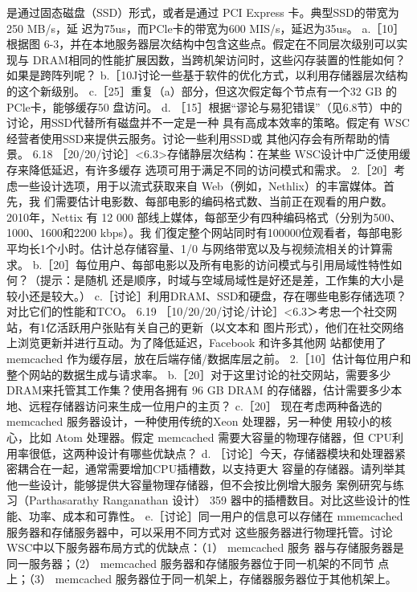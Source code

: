 是通过固态磁盘（SSD）形式，或者是通过 PCI Express 卡。典型SSD的带宽为250 MB/s，延
迟为75us，而PCle卡的带宽为600 MIS/s，延迟为35us。
a.［10］根据图 6-3，并在本地服务器层次结构中包含这些点。假定在不同层次级别可以实现与
DRAM相同的性能扩展因数，当跨机架访问时，这些闪存装置的性能如何？如果是跨阵列呢？
b.［10J讨论一些基于软件的优化方式，以利用存储器层次结构的这个新级别。
c.［25］重复（a）部分，但这次假定每个节点有一个32 GB 的PCle卡，能够缓存50%
盘访问。
d. ［15］根据“谬论与易犯错误”（见6.8节）中的讨论，用SSD代替所有磁盘并不一定是一种
具有高成本效率的策略。假定有 WSC经营者使用SSD来提供云服务。讨论一些利用SSD或
其他闪存会有所帮助的情景。
6.18
［20/20/讨论］<6.3>存储静层次结构：在某些 WSC设计中广泛使用缓存来降低延迟，有许多缓存
选项可用于满足不同的访问模式和需求。
2.［20］考虑一些设计选项，用于以流式获取来自 Web（例如，Nethlix）的丰富媒体。首先，我
们需要估计电影数、每部电影的编码格式数、当前正在观看的用户数。2010年，Nettix 有
12 000 部线上媒体，每部至少有四种编码格式（分别为500、1000、1600和2200 kbps）。我
们復定整个网站同时有100000位观看者，每部电影平均长1个小时。估计总存储容量、1/0
与网络带宽以及与视频流相关的计算需求。
b.［20］每位用户、每部电影以及所有电影的访问模式与引用局域性特性如何？（提示：是随机
还是顺序，时域与空域局域性是好还是差，工作集的大小是较小还是较大。）
c.［讨论］利用DRAM、SSD和硬盘，存在哪些电影存储选项？对比它们的性能和TCO。
6.19 ［10/20/20/讨论/计论］<6.3＞考忠一个社交网站，有1亿活跃用户张贴有关自己的更新（以文本和
图片形式），他们在社交网络上浏览更新并进行互动。为了降低延迟，Facebook 和许多其他网
站都使用了 memcached 作为缓存层，放在后端存储/数据库层之前。
2.［10］估计每位用户和整个网站的数据生成与请求率。
b.［20］对于这里讨论的社交网站，需要多少 DRAM来托管其工作集？使用各拥有 96 GB DRAM
的存储器，估计需要多少本地、远程存储器访问来生成一位用户的主页？
c.［20］ 现在考虑两种备选的 memcached 服务器设计，一种使用传统的Xeon 处理器，另一种使
用较小的核心，比如 Atom 处理器。假定 memcached 需要大容量的物理存储器，但 CPU利
用率很低，这两种设计有哪些优缺点？
d. ［讨论］今天，存储器模块和处理器紧密耦合在一起，通常需要增加CPU插槽数，以支持更大
容量的存储器。请列举其他一些设计，能够提供大容量物理存储器，但不会按比例增大服务
案例研究与练习（Parthasarathy Ranganathan 设计）
359
器中的插槽数目。对比这些设计的性能、功率、成本和可靠性。
e.［讨论］同一用户的信息可以存储在 mmemcached 服务器和存储服务器中，可以采用不同方式对
这些服务器进行物理托管。讨论 WSC中以下服务器布局方式的优缺点：（1） memcached 服务
器与存储服务器是同一服务器；（2） memcached 服务器和存储服务器位于同一机架的不同节
点上；（3） memcached 服务器位于同一机架上，存储器服务器位于其他机架上。
